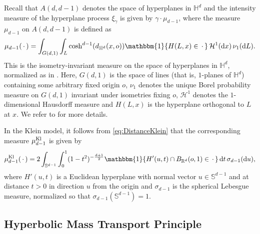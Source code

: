 \documentclass[12pt,a4paper]{article}
\theoremstyle{definition}
\renewcommand{\H}{\mathbb{H}}
\newcommand{\R}{\mathbb{R}}
\newcommand{\dint}{{\rm d}}
\newcommand{\one}{\mathbbm{1}}
\begin{document}


Recall that $A(d,d-1)$ denotes the space of hyperplanes in $\mathbb{H}^d$ and the intensity measure of the hyperplane process \(\xi_\gamma\) is given by \(\gamma \cdot \mu_{d-1}\), where the measure \(\mu_{d-1}\) on \(A(d,d-1)\) is defined as
\begin{equation}\label{eq:def_intensity_measure}
    \mu_{d-1}(\,\cdot\,) = \int_{G(d,1)} \int_L \cosh^{d-1}(d_{\mathbb{H}^d}(x,o)) \one\{H(L,x) \in \,\cdot\,\} \,\mathcal{H}^1(\dint x) \,\nu_1(\dint L).
\end{equation}
This is the isometry-invariant measure on the space of hyperplanes in $\H^d$, normalized as in \cite{HHT21,BHT23,BHT25}.
Here, \(G(d,1)\) is the space of lines (that is, $1$-planes of $\H^d$) containing some arbitrary fixed origin \(o\), \(\nu_1\) denotes the unique Borel probability measure on \(G(d,1)\) invariant under isometries fixing \(o\), \(\mathcal{H}^1\) denotes the \(1\)-dimensional Hausdorff measure and \(H(L,x)\) is the hyperplane orthogonal to \(L\) at \(x\).
We refer to \cite{HHT21,BHT23,BHT25} for more details.

In the Klein model, it follows from \eqref{eq:DistanceKlein} that the corresponding measure $\mu_{d-1}^{\rm Kl}$ is given by
\begin{equation}\label{eq:KleinHyperplaneModel}
\mu_{d-1}^{\rm Kl}(\,\cdot\,)=2\int_{\mathbb{S}^{d-1}}\int_{0}^1(1-t^2)^{-{d+1\over 2}}\one\{H'(u,t) \cap B_{\R^d}(o,1) \in \,\cdot\,\} \,\dint t \,\sigma_{d-1}(\dint u),
\end{equation}
where $H'(u,t)$ is a Euclidean hyperplane with normal vector $u\in \mathbb{S}^{d-1}$ and at distance $t>0$ in direction $u$ from the origin and $\sigma_{d-1}$ is the spherical Lebesgue measure, normalized so that $\sigma_{d-1}(\mathbb S^{d-1}) = 1$.

\subsection{Hyperbolic Mass Transport Principle}\label{sec:MassTransport}
\end{document}
